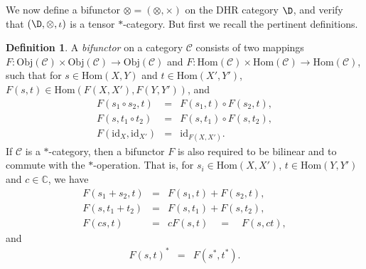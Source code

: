 \documentclass[12pt]{article}
\theoremstyle{definition}
\theoremstyle{definition}
\newtheorem{defn}[thm]{Definition}
\theoremstyle{remark}
\newcommand{\Obj}{\mathrm{Obj}}
\def\2#1{{\mathcal #1}}
\def\7#1{{\mathbb #1}}
\newcommand{\Hom}{\mathrm{Hom}}
\def\id{\mathrm{id}}
\begin{document}
\label{tensor}

We now define a bifunctor $\otimes =(\otimes ,\times )$
on the DHR category $\D$, and verify that $(\D ,\otimes
,\iota )$ is a tensor $*$-category.  But first we
recall the pertinent definitions.

\begin{defn} A \emph{bifunctor} on a category $\2C$
  consists of two mappings $F:\Obj (\2C)\times \Obj
  (\2C )\to \Obj(\2C )$ and $F:\Hom (\2C )\times \Hom
  (\2C )\to \Hom (\2C )$, such that for $s\in \Hom
  (X,Y)$ and $t\in \Hom (X',Y')$, $F(s,t)\in \Hom
  (F(X,X'),F(Y,Y'))$, and
  \begin{eqnarray*} 
    F(s_1\circ s_2,t) & = & F(s_1,t)\circ F(s_2,t),  \\
    F(s,t_1\circ t_2) & = & F(s,t_1)\circ F(s,t_2), \\
    F(\id _X ,\id_{X'}) & = & \id _{F(X,X')} .
\end{eqnarray*} 
If $\2C$ is a $*$-category, then a bifunctor $F$ is
also required to be bilinear and to commute with the
$*$-operation.  That is, for $s_i\in \Hom (X,X')$,
$t\in \Hom (Y,Y')$ and $c\in \7C$, we have
\begin{eqnarray*} 
  F(s_1+s_2,t) &=& F(s_1,t)+F(s_2,t) ,\\
  F(s,t_1+t_2) &=& F(s,t_1)+F(s,t_2) , \\
  F(cs,t) &=& cF(s,t) \quad =\quad F(s,ct) ,
\end{eqnarray*}
and
\begin{eqnarray*}
  F(s,t)^* &=& F(s^*,t^* ) .
\end{eqnarray*}
\end{defn}
\end{document}
